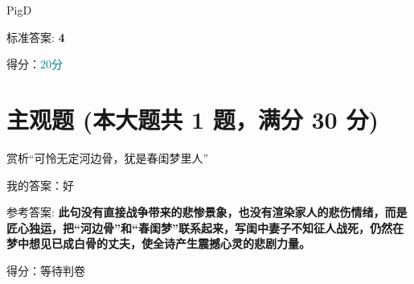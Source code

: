\documentclass[12pt, a4paper, addpoints, answers]{exam}
\begin{document}
\begin{questions}
\question[20] PigD

\begin{oneparchoices}
\end{oneparchoices}

标准答案: \textbf{4}

得分：\textcolor{teal}{20分}

\end{questions}

\hspace{5cm}

\section{\normalsize{主观题 (本大题共 1 题，满分 30 分)}}
\hspace{1.5cm}

\begin{questions}
\question[30] 赏析“可怜无定河边骨，犹是春闺梦里人”

我的答案：好

参考答案: \textbf{此句没有直接战争带来的悲惨景象，也没有渲染家人的悲伤情绪，而是匠心独运，把“河边骨”和“春闺梦”联系起来，写闺中妻子不知征人战死，仍然在梦中想见已成白骨的丈夫，使全诗产生震撼心灵的悲剧力量。}

得分：等待判卷   

\end{questions}
\end{document}
